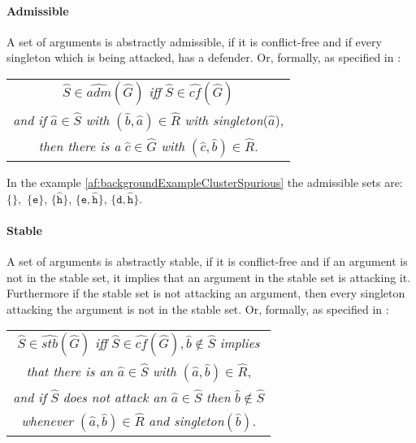 \paragraph{Admissible} A set of arguments is abstractly admissible, if it is conflict-free and if every singleton which is being attacked, has a defender. Or, formally, as specified in \cite{DBLP:conf/kr/SaribaturW21}:

\begin{center}
    \begin{tabular}{c}
        $\hat{S} \in \hat{adm}(\hat{G})$ \textit{iff} $\hat{S} \in \hat{cf}(\hat{G})$\\

        \textit{and if} $\hat{a} \in \hat{S}$ \textit{with} $(\hat{b}, \hat{a}) \in \hat{R}$ \textit{with singleton}($\hat{a}$),\\

        \textit{then there is a} $\hat{c} \in \hat{G}$ \textit{with} $(\hat{c}, \hat{b}) \in \hat{R}$.
    \end{tabular}
\end{center}

In the example \cref{af:backgroundExampleClusterSpurious} the admissible sets are:
$\mathtt{\{\}},$
$\mathtt{\{e}\}$,
$\mathtt{\{\hat{h}}\}$,
$\mathtt{\{e, \hat{h}}\}$,
$\mathtt{\{d, \hat{h}}\}$.



\paragraph{Stable} A set of arguments is abstractly stable, if it is conflict-free and if an argument is not in the stable set, it implies that an argument in the stable set is attacking it. Furthermore if the stable set is not attacking an argument, then every singleton attacking the argument is not in the stable set. Or, formally, as specified in \cite{DBLP:conf/kr/SaribaturW21}:
\begin{center}
    \begin{tabular}{c}
        $\hat{S} \in \hat{stb}(\hat{G})$ \textit{iff} $\hat{S} \in \hat{cf}(\hat{G}),  \hat{b} \not\in \hat{S}$ \textit{implies}\\

        \textit{that there is an} $\hat{a} \in \hat{S}$ \textit{with} $(\hat{a}, \hat{b}) \in \hat{R}$,\\

        \textit{and if} $\hat{S}$ \textit{does not attack an} $\hat{a} \in \hat{S}$ \textit{then} $\hat{b} \not\in \hat{S}$\\

        \textit{whenever} $(\hat{a}, \hat{b}) \in \hat{R}$ \textit{and singleton}$(\hat{b})$.
    \end{tabular}
\end{center}

